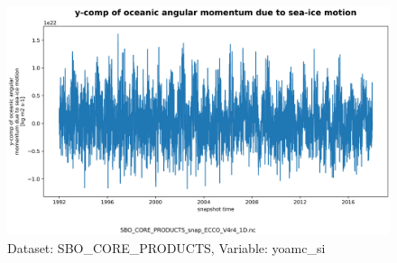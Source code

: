 \begin{figure}[H]
\centering
\includegraphics[scale=0.55]{../images/plots/v4r4/oneD_plots/SBO_Core_Products/yoamc_si.png}
\caption{Dataset: SBO\_CORE\_PRODUCTS, Variable: yoamc\_si}
\label{tab:table-SBO_CORE_PRODUCTS_yoamc_si-Plot}
\end{figure}
\newpage
\pagebreak
